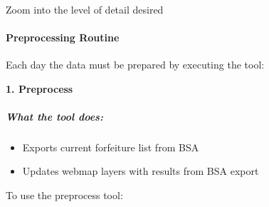   \vspace{1in}

  \\
  
  \begin{flushright}
\lookArrow
\end{flushright}
  \vspace{.1in}

  \vspace{2in}
  
  
  \vspace{.25in}
  
\begin{flushright}
\lookArrow
\end{flushright}
  
  \noindent Zoom into the level of detail desired
    
 \vspace{1in}
  
  {\btn{} \lookArrow}
  
  \clearpage
  
 \paragraph{Preprocessing Routine}

 \vspace{.2in}

 Each day the data must be prepared by executing the tool:
 \vspace{.2in}

 \textbf{1. Preprocess}

 \vspace{.2in}

  \subparagraph*{What the tool does:}
  \vspace{.15in}

  \begin{itemize}
  \item Exports current forfeiture list from BSA
  \item Updates webmap layers with results from BSA export
  \end{itemize}
  To use the preprocess tool:
 \vspace{.15in}

